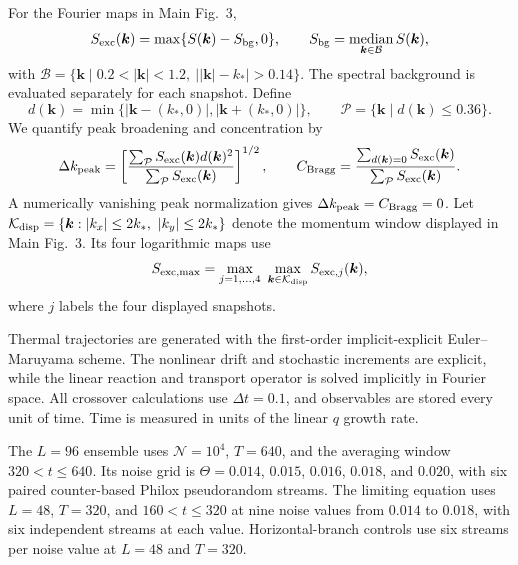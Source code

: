 \documentclass[aps,prl,twocolumn,superscriptaddress,nofootinbib,floatfix]{revtex4-2}
\newcommand{\cN}{\mathcal N}
\begin{document}
For the Fourier maps in Main Fig.~3,
\begin{equation}
 S_{\rm exc}(\bm k)=\max\{S(\bm k)-S_{\rm bg},0\},
 \qquad
 S_{\rm bg}=\operatorname*{median}_{\bm k\in\mathcal B}S(\bm k),
 \label{eq:SexcS}
\end{equation}
with $\mathcal B=\{\bm k\mathrel{|}0.2<|\bm k|<1.2,\ \bigl||\bm k|-k_*\bigr|>0.14\}$. The spectral background is evaluated separately for each snapshot. Define
\begin{equation}
 d(\bm k)=\min\{|\bm k-(k_*,0)|,|\bm k+(k_*,0)|\},
 \qquad
 \mathcal P=\{\bm k\mathrel{|}d(\bm k)\le0.36\}.
 \label{eq:peakNeighborhoodS}
\end{equation}
We quantify peak broadening and concentration by
\begin{equation}
 \Delta k_{\rm peak}=\left[\frac{\sum_{\mathcal P}S_{\rm exc}(\bm k)d(\bm k)^2}{\sum_{\mathcal P}S_{\rm exc}(\bm k)}\right]^{1/2},
 \qquad
 C_{\rm Bragg}=\frac{\sum_{d(\bm k)=0}S_{\rm exc}(\bm k)}{\sum_{\mathcal P}S_{\rm exc}(\bm k)}.
 \label{eq:braggDiagnosticsS}
\end{equation}
A numerically vanishing peak normalization gives $\Delta k_{\rm peak}=C_{\rm Bragg}=0$. Let $\mathcal K_{\rm disp}=\{\bm k:|k_x|\le2k_*,\ |k_y|\le2k_*\}$ denote the momentum window displayed in Main Fig.~3. Its four logarithmic maps use
\begin{equation}
 S_{\rm exc,max}=\max_{j=1,\ldots,4}\ \max_{\bm k\in\mathcal K_{\rm disp}}S_{{\rm exc},j}(\bm k),
 \label{eq:SexcMaxS}
\end{equation}
where $j$ labels the four displayed snapshots.

Thermal trajectories are generated with the first-order implicit-explicit Euler--Maruyama scheme. The nonlinear drift and stochastic increments are explicit, while the linear reaction and transport operator is solved implicitly in Fourier space. All crossover calculations use $\Delta t=0.1$, and observables are stored every unit of time. Time is measured in units of the linear $q$ growth rate.

The $L=96$ ensemble uses $\cN=10^4$, $T=640$, and the averaging window $320<t\le640$. Its noise grid is $\Theta=0.014$, $0.015$, $0.016$, $0.018$, and $0.020$, with six paired counter-based Philox pseudorandom streams. The limiting equation uses $L=48$, $T=320$, and $160<t\le320$ at nine noise values from $0.014$ to $0.018$, with six independent streams at each value. Horizontal-branch controls use six streams per noise value at $L=48$ and $T=320$.
\end{document}
